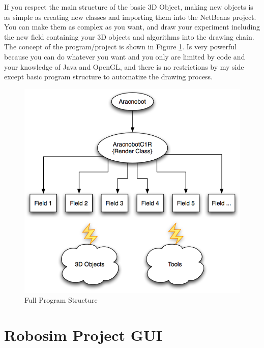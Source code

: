 \documentclass[12pt,a4paper,oneside,english]{book}
\begin{document}
If you respect the main structure of the basic 3D Object, making new objects is as simple as creating new classes and importing them into the NetBeans project. You can make them as complex as you want, and draw your experiment including the new field containing your 3D objects and algorithms into the drawing chain. The concept of the program/project is shown in Figure \ref{full program structure}. Is very powerful because you can do whatever you want and you only are limited by code and your knowledge of Java and OpenGL, and there is no restrictions by my side except basic program structure to automatize the drawing process.

\begin{figure}[htbp]
  \begin{center}
    \includegraphics[width=1.0\textwidth]{images/FPS.png}
    \caption{Full Program Structure}
    \label{full program structure}
  \end{center}
\end{figure}


\mainmatter


\part{Robosim Project GUI}
\end{document}
